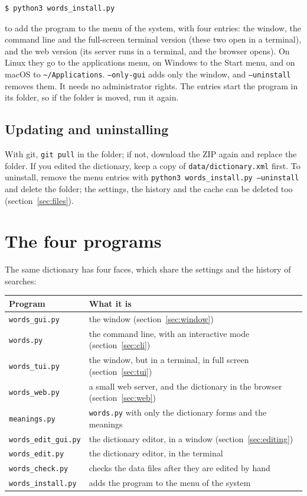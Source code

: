 \documentclass[12pt,
              article,
              oneside
              ]{memoir}
\begin{document}
\begin{verbatim}
$ python3 words_install.py
\end{verbatim}

\noindent
to add the program to the menu of the system, with four entries: the
window, the command line and the full-screen terminal version (these two
open in a terminal), and the web version (its server runs in a terminal,
and the browser opens). On Linux they go to the applications menu, on
Windows to the Start menu, and on macOS to \texttt{\textasciitilde/Applications}.
\texttt{--only-gui} adds only the window, and \texttt{--uninstall} removes
them. It needs no administrator rights. The entries start the program in
its folder, so if the folder is moved, run it again.

\subsection{Updating and uninstalling}

%
With git, \texttt{git pull} in the folder; if not, download the ZIP again
and replace the folder. If you edited the dictionary, keep a copy of
\texttt{data/dictionary.xml} first. To uninstall, remove the menu entries
with \texttt{python3 words\_install.py --uninstall} and delete the folder;
the settings, the history and the cache can be deleted too
(section~\ref{sec:files}).

\section{The four programs}
\label{sec:programs}

%
The same dictionary has four faces, which share the settings and the
history of searches:

\begin{longtable}{@{}lp{}@{}}
\toprule
Program & What it is\\
\midrule
\endhead
\texttt{words\_gui.py} & the window (section~\ref{sec:window})\\
\texttt{words.py} & the command line, with an interactive mode (section~\ref{sec:cli})\\
\texttt{words\_tui.py} & the window, but in a terminal, in full screen (section~\ref{sec:tui})\\
\texttt{words\_web.py} & a small web server, and the dictionary in the browser (section~\ref{sec:web})\\
\texttt{meanings.py} & \texttt{words.py} with only the dictionary forms and the meanings\\
\texttt{words\_edit\_gui.py} & the dictionary editor, in a window (section~\ref{sec:editing})\\
\texttt{words\_edit.py} & the dictionary editor, in the terminal\\
\texttt{words\_check.py} & checks the data files after they are edited by hand\\
\texttt{words\_install.py} & adds the program to the menu of the system\\
\bottomrule
\end{longtable}
\end{document}
